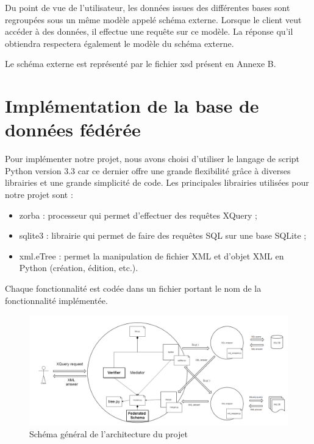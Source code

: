 Du point de vue de l'utilisateur, les données issues des différentes bases sont regroupées sous un même modèle appelé schéma externe. Lorsque le client veut accéder à des données, il effectue une requête sur ce modèle. La réponse qu'il obtiendra respectera également le modèle du schéma externe.

Le schéma externe est représenté par le fichier xsd présent en Annexe B.

\section{Implémentation de la base de données fédérée}

Pour implémenter notre projet, nous avons choisi d'utiliser le langage de script Python version 3.3 car ce dernier offre une grande flexibilité grâce à diverses librairies et une grande simplicité de code. Les principales librairies utilisées pour notre projet sont :

\begin{itemize}
    \item zorba : processeur qui permet d'effectuer des requêtes XQuery ;

    \item sqlite3 : librairie qui permet de faire des requêtes SQL sur une base SQLite ;

    \item xml.eTree : permet la manipulation de fichier XML et d'objet XML en Python (création, édition, etc.).
\end{itemize}

Chaque fonctionnalité est codée dans un fichier portant le nom de la fonctionnalité implémentée.

\begin{figure}[h!]
    \centering
    \includegraphics[width=1\textwidth]{ressources/graphiques/architecture.png}
    \caption{Schéma général de l'architecture du projet}
\end{figure}

